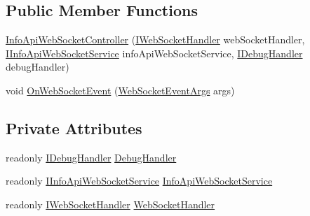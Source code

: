 \subsection*{Public Member Functions}
\begin{DoxyCompactItemize}
\item 
\mbox{\hyperlink{class_little_weeb_library_1_1_controllers_1_1_sub_controllers_1_1_info_api_web_socket_controller_a7c884b59b148f11761492b39619acf32}{Info\+Api\+Web\+Socket\+Controller}} (\mbox{\hyperlink{interface_little_weeb_library_1_1_handlers_1_1_i_web_socket_handler}{I\+Web\+Socket\+Handler}} web\+Socket\+Handler, \mbox{\hyperlink{interface_little_weeb_library_1_1_services_1_1_i_info_api_web_socket_service}{I\+Info\+Api\+Web\+Socket\+Service}} info\+Api\+Web\+Socket\+Service, \mbox{\hyperlink{interface_little_weeb_library_1_1_handlers_1_1_i_debug_handler}{I\+Debug\+Handler}} debug\+Handler)
\item 
void \mbox{\hyperlink{class_little_weeb_library_1_1_controllers_1_1_sub_controllers_1_1_info_api_web_socket_controller_ad620537574b819085ff8eb394add2912}{On\+Web\+Socket\+Event}} (\mbox{\hyperlink{class_little_weeb_library_1_1_event_arguments_1_1_web_socket_event_args}{Web\+Socket\+Event\+Args}} args)
\end{DoxyCompactItemize}
\subsection*{Private Attributes}
\begin{DoxyCompactItemize}
\item 
readonly \mbox{\hyperlink{interface_little_weeb_library_1_1_handlers_1_1_i_debug_handler}{I\+Debug\+Handler}} \mbox{\hyperlink{class_little_weeb_library_1_1_controllers_1_1_sub_controllers_1_1_info_api_web_socket_controller_a157706fc440b32d465de389a727a90c0}{Debug\+Handler}}
\item 
readonly \mbox{\hyperlink{interface_little_weeb_library_1_1_services_1_1_i_info_api_web_socket_service}{I\+Info\+Api\+Web\+Socket\+Service}} \mbox{\hyperlink{class_little_weeb_library_1_1_controllers_1_1_sub_controllers_1_1_info_api_web_socket_controller_a188679b63479808515ecf4850f70b3e3}{Info\+Api\+Web\+Socket\+Service}}
\item 
readonly \mbox{\hyperlink{interface_little_weeb_library_1_1_handlers_1_1_i_web_socket_handler}{I\+Web\+Socket\+Handler}} \mbox{\hyperlink{class_little_weeb_library_1_1_controllers_1_1_sub_controllers_1_1_info_api_web_socket_controller_a4edb97d9c7fc56d1e93351f197144ca8}{Web\+Socket\+Handler}}
\end{DoxyCompactItemize}


